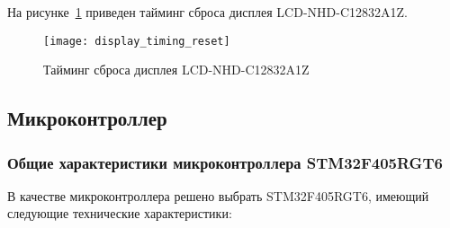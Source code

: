 \documentclass[document.tex]{subfiles}
\begin{document}
На рисунке~\ref{fig:display_timing_reset} приведен тайминг сброса дисплея LCD-NHD-C12832A1Z.
\begin{figure}[here]
\centering
\texttt{[image: display\_timing\_reset]}
\caption{Тайминг сброса дисплея LCD-NHD-C12832A1Z}
\label{fig:display_timing_reset}
\end{figure}

\clearpage
\subsection{Микроконтроллер}
\subsubsection{Общие характеристики микроконтроллера STM32F405RGT6}
В качестве микроконтроллера решено выбрать STM32F405RGT6, имеющий следующие технические характеристики:
\end{document}
